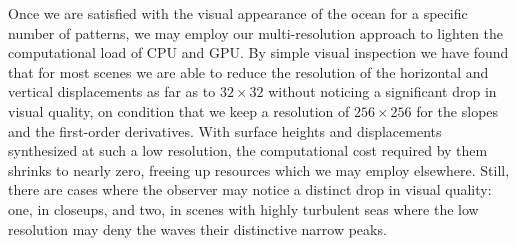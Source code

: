 Once we are satisfied with the visual appearance of the ocean for a specific
number of patterns, we may employ our multi-resolution approach
to lighten the computational load of CPU and GPU. By simple visual inspection
we have found that for most scenes we are able to reduce the resolution of
the horizontal and vertical displacements as far as to $32\times32$ without
noticing a significant drop in visual quality, on condition that we keep a
resolution of $256\times256$ for the slopes and the first-order derivatives.
%
With surface heights and displacements synthesized at such a low resolution,
the computational cost required by them shrinks to nearly zero, freeing
up resources which we may employ elsewhere.
%
Still, there are cases where the observer may notice a distinct drop in
visual quality: one, in closeups, and two, in scenes with highly turbulent
seas where the low resolution may deny the waves their distinctive narrow
peaks.
%
%
%
